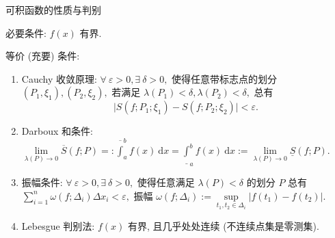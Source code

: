 \begin{frame}{可积函数的性质与判别}

必要条件: $f(x)$ 有界.

\pause
\vspace{1em}

等价 (充要) 条件:
\pause
\begin{enumerate}[<+->]
\item Cauchy 收敛原理: $\forall ~ \varepsilon > 0, \exists ~ \delta > 0,$ 使得任意带标志点的划分 $(P_1, \xi_1), (P_2, \xi_2),$ 若满足 $\lambda(P_1) < \delta, \lambda(P_2) < \delta,$ 总有
\[\lvert S(f; P_1; \xi_1) - S(f; P_2; \xi_2) \rvert < \varepsilon.\]
\item Darboux 和条件: $\lim\limits_{\lambda(P) \to 0} \overline{S}(f; P) =: \overline{\int}_a^b f(x) ~ \mathrm{d} x = \underline{\int}_a^b f(x) ~ \mathrm{d} x := \lim\limits_{\lambda(P) \to 0} \underline{S}(f; P).$
\item 振幅条件: $\forall ~ \varepsilon > 0, \exists ~ \delta > 0,$ 使得任意满足 $\lambda(P) < \delta$ 的划分 $P$ 总有
$\sum\limits_{i=1}^n \omega(f; \Delta_i) \Delta x_i < \varepsilon,$ 振幅 $\omega(f; \Delta_i) := \sup\limits_{t_1, t_2 \in \Delta_i} \lvert f(t_1) - f(t_2) \rvert.$
\item Lebesgue 判别法: $f(x)$ 有界, 且几乎处处连续 (不连续点集是零测集).
\end{enumerate}

\end{frame}


